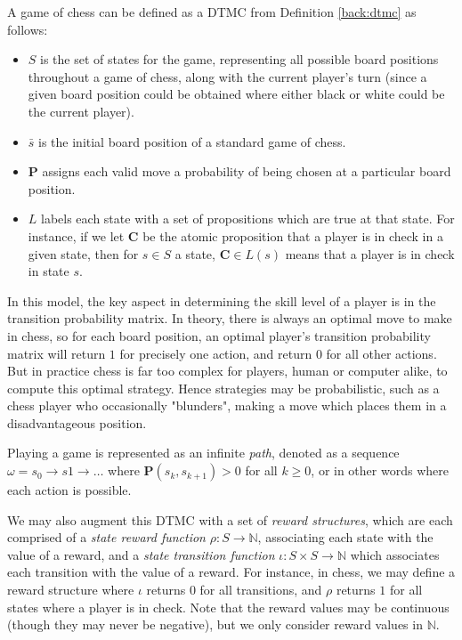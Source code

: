 \begin{example}
\label{back:chess}

    A game of chess can be defined as a DTMC from Definition \ref{back:dtmc} as follows:

    \begin{itemize}
        \item $S$ is the set of states for the game, representing all possible board positions throughout a game of chess, along with the current player's turn (since a given board position could be obtained where either black or white could be the current player).
        \item $\bar{s}$ is the initial board position of a standard game of chess.
        \item $\mathbf{P}$ assigns each valid move a probability of being chosen at a particular board position.
        \item $L$ labels each state with a set of propositions which are true at that state. For instance, if we let $\mathbf{C}$ be the atomic proposition that a player is in check in a given state, then for $s \in S$ a state, $\mathbf{C} \in L(s)$ means that a player is in check in state $s$.
    \end{itemize}

    In this model, the key aspect in determining the skill level of a player is in the transition probability matrix. In theory, there is always an optimal move to make in chess, so for each board position, an optimal player's transition probability matrix will return $1$ for precisely one action, and return $0$ for all other actions. But in practice chess is far too complex for players, human or computer alike, to compute this optimal strategy. Hence strategies may be probabilistic, such as a chess player who occasionally "blunders", making a move which places them in a disadvantageous position.

\end{example}

Playing a game is represented as an infinite \emph{path}, denoted as a sequence $\omega = s_0 \rightarrow s1 \rightarrow \dots$ where $\mathbf{P}(s_k, s_{k+1})>0$ for all $k\geq0$, or in other words where each action is possible.

We may also augment this DTMC with a set of \emph{reward structures}, which are each comprised of a \emph{state reward function} $\rho : S \rightarrow \mathbb{N}$, associating each state with the value of a reward, and a \emph{state transition function} $\iota : S \times S \rightarrow \mathbb{N}$ which associates each transition with the value of a reward. For instance, in chess, we may define a reward structure where $\iota$ returns $0$ for all transitions, and $\rho$ returns $1$ for all states where a player is in check. Note that the reward values may be continuous (though they may never be negative), but we only consider reward values in $\mathbb{N}$.

